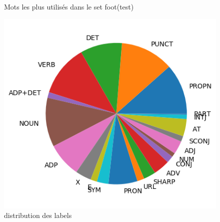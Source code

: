 \begin{figure}[H]
\begin{minipage}{0.48\textwidth}
\begin{tabular}{|l || *{11 }{|c} |}
\end{tabular}
\caption{ Mots les plus utilisés dans le set foot(test) } \label{Fig:muw}\end{minipage} 
\begin{minipage}{0.48\textwidth} \centering
\includegraphics[width=.7\linewidth]{foottest_img.png}
\caption{distribution des labels}
\end{minipage}
\end{figure}


